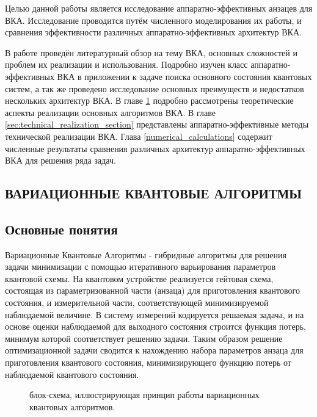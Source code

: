 \documentclass[14pt]{extarticle}
\begin{document}
\qquad Целью данной работы является исследование аппаратно-эффективных анзацев для ВКА. Исследование проводится путём численного моделирования их работы, и сравнения эффективности различных аппаратно-эффективных архитектур ВКА.

\qquad В работе проведён литературный обзор на тему ВКА, основных сложностей и проблем их реализации и использования. Подробно изучен класс аппаратно-эффективных ВКА в приложении к задаче поиска основного состояния квантовых систем, а так же проведено исследование основных преимуществ и недостатков нескольких архитектур ВКА. В главе \ref{sec:VQA_section} подробно рассмотрены теоретические аспекты реализации основных алгоритмов ВКА. В главе \ref{sec:technical_realization_section} представлены аппаратно-эффективные методы технической реализации ВКА. Глава \ref{numerical_calculations} содержит численные результаты сравнения различных архитектур аппаратно-эффективных ВКА для решения ряда задач.

\newpage

\begin{center}
\section{ВАРИАЦИОННЫЕ КВАНТОВЫЕ АЛГОРИТМЫ} \label{sec:VQA_section}
\end{center}


\subsection{Основные понятия}

\qquad Вариационные Квантовые Алгоритмы - гибридные алгоритмы для решения задачи минимизации с помощью итеративного варьирования параметров квантовой схемы. На квантовом устройстве реализуется гейтовая схема, состоящая из параметризованной части (анзаца) для приготовления квантового состояния, и  измерительной части, соответствующей минимизируемой наблюдаемой величине. В систему измерений кодируется решаемая задача, и на основе оценки наблюдаемой для выходного состояния строится функция потерь, минимум которой соответствует решению задачи. Таким образом решение оптимизационной задачи сводится к нахождению набора параметров анзаца для приготовления квантового состояния, минимизирующего функцию потерь от наблюдаемой квантового состояния.

\begin{figure}[H]
\caption{блок-схема, иллюстрирующая принцип работы вариационных квантовых алгоритмов.}\label{fig:VQA}
\end{figure}
\end{document}

